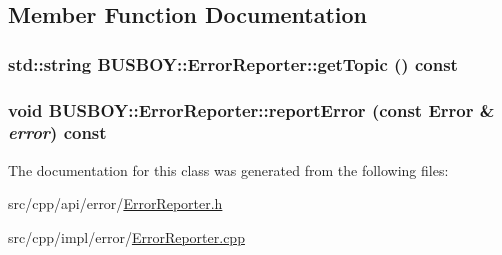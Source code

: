 \subsection{Member Function Documentation}
\hypertarget{classBUSBOY_1_1ErrorReporter_a98d8d47db959aa6bc5d3dccd42ef104c}{
\subsubsection[{getTopic}]{\setlength{\rightskip}{0pt plus 5cm}std::string BUSBOY::ErrorReporter::getTopic () const}}
\label{classBUSBOY_1_1ErrorReporter_a98d8d47db959aa6bc5d3dccd42ef104c}
\hypertarget{classBUSBOY_1_1ErrorReporter_a4a7d834a994488065a1d96cba82a8c40}{
\subsubsection[{reportError}]{\setlength{\rightskip}{0pt plus 5cm}void BUSBOY::ErrorReporter::reportError (const {\bf Error} \& {\em error}) const}}
\label{classBUSBOY_1_1ErrorReporter_a4a7d834a994488065a1d96cba82a8c40}


The documentation for this class was generated from the following files:\begin{DoxyCompactItemize}
\item 
src/cpp/api/error/\hyperlink{ErrorReporter_8h}{ErrorReporter.h}\item 
src/cpp/impl/error/\hyperlink{ErrorReporter_8cpp}{ErrorReporter.cpp}\end{DoxyCompactItemize}
